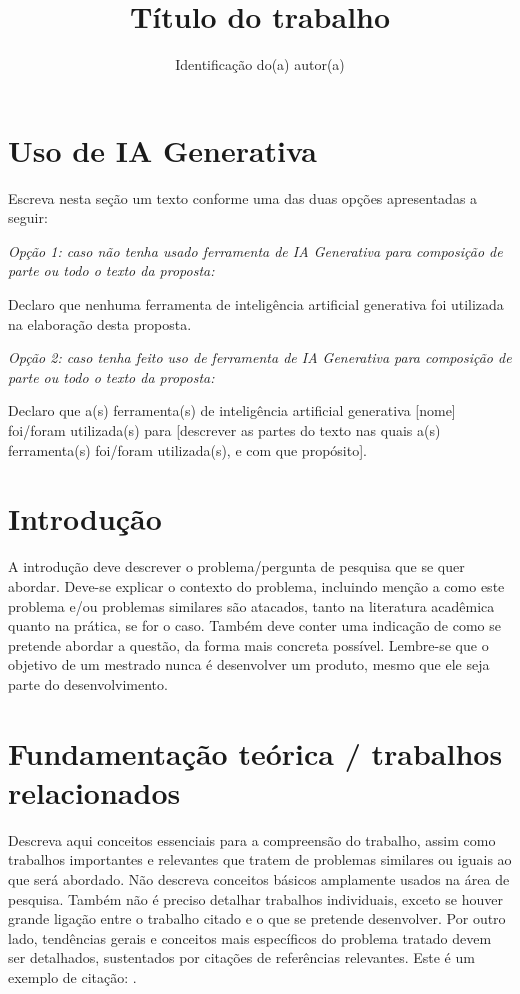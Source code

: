 \documentclass{article}
\title{Título do trabalho}
\author{Identificação do(a) autor(a)}
\begin{document}
\maketitle


\section*{Uso de IA Generativa}

Escreva nesta seção um texto conforme uma das duas opções apresentadas a seguir:

\textit{Opção 1: caso não tenha usado ferramenta de IA Generativa para composição de parte ou todo o texto da proposta:}

Declaro que nenhuma ferramenta de inteligência artificial generativa foi utilizada na elaboração desta proposta.

\textit{Opção 2: caso tenha feito uso de ferramenta de IA Generativa para composição de parte ou todo o texto da proposta:}

Declaro que a(s) ferramenta(s) de inteligência artificial generativa [nome] foi/foram utilizada(s) para [descrever as partes do texto nas quais a(s) ferramenta(s) foi/foram utilizada(s), e com que propósito].

\section{Introdução}

A introdução deve descrever o problema/pergunta de pesquisa que se quer abordar. Deve-se explicar o contexto do problema, incluindo menção a como este problema e/ou problemas similares são atacados, tanto na literatura acadêmica quanto na prática, se for o caso. Também deve conter uma indicação de como se pretende abordar a questão, da forma mais concreta possível. Lembre-se que o objetivo de um mestrado nunca é desenvolver um produto, mesmo que ele seja parte do desenvolvimento.

\section{Fundamentação teórica / trabalhos relacionados}

Descreva aqui conceitos essenciais para a compreensão do trabalho, assim como trabalhos importantes e relevantes que tratem de problemas similares ou iguais ao que será abordado. Não descreva conceitos básicos amplamente usados na área de pesquisa. Também não é preciso detalhar trabalhos individuais, exceto se houver grande ligação entre o trabalho citado e o que se pretende desenvolver. Por outro lado, tendências gerais e conceitos mais específicos do problema tratado devem ser detalhados, sustentados por citações de referências relevantes. Este é um exemplo de citação: \cite{kurose2021}.
\end{document}
